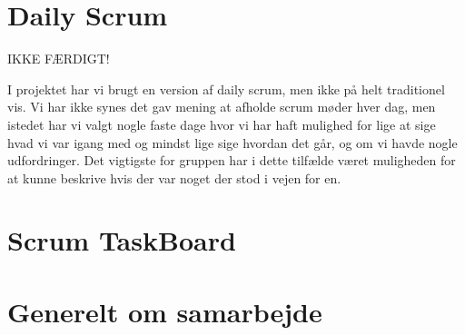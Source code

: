 \section{Daily Scrum}
IKKE FÆRDIGT!

I projektet har vi brugt en version af daily scrum, men ikke på helt traditionel vis. Vi har ikke synes det gav mening at afholde scrum møder hver dag, men istedet har vi valgt nogle faste dage hvor vi har haft mulighed for lige at sige hvad vi var igang med og mindst lige sige hvordan det går, og om vi havde nogle udfordringer. Det vigtigste for gruppen har i dette tilfælde været muligheden for at kunne beskrive hvis der var noget der stod i vejen for en. 

\section{Scrum TaskBoard}

\section{Generelt om samarbejde}
